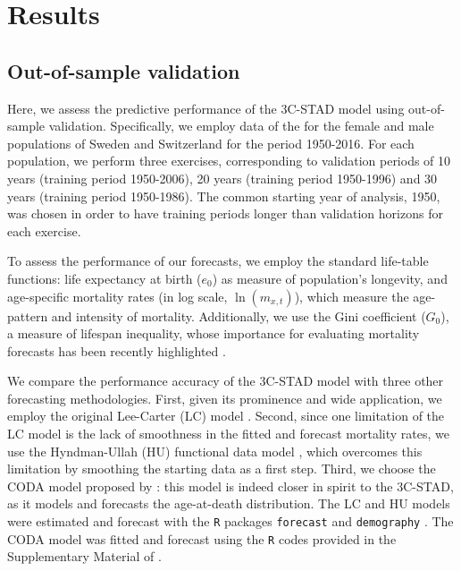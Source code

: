 \documentclass[Thesis]{subfiles}
\begin{document}

\section{Results}\label{Sec:Ch4sec3}


\subsection{Out-of-sample validation}\label{Subsec:Ch4subsec3.1}

Here, we assess the predictive performance of the 3C-STAD model using out-of-sample validation. Specifically, we employ data of the \cite{HMD} for the female and male populations of Sweden and Switzerland for the period 1950-2016. For each population, we perform three exercises, corresponding to validation periods of 10 years (training period 1950-2006), 20 years (training period 1950-1996) and 30 years (training period 1950-1986). The common starting year of analysis, 1950, was chosen in order to have training periods longer than validation horizons for each exercise. 

To assess the performance of our forecasts, we employ the standard life-table functions: life expectancy at birth ($e_{0}$) as measure of population's longevity, and age-specific mortality rates (in log scale, $\ln(m_{x,t})$), which measure the age-pattern and intensity of mortality. Additionally, we use the Gini coefficient ($G_{0}$), a measure of lifespan inequality, whose importance for evaluating mortality forecasts has been recently highlighted \citep{bohk2017lifespan}. 

We compare the performance accuracy of the 3C-STAD model with three other forecasting methodologies. First, given its prominence and wide application, we employ the original Lee-Carter (LC) model \citep{lee1992modeling}. Second, since one limitation of the LC model is the lack of smoothness in the fitted and forecast mortality rates, we use the Hyndman-Ullah (HU) functional data model \citep{hyndman2007robust}, which overcomes this limitation by smoothing the starting data as a first step. Third, we choose the CODA model proposed by \cite{oeppen2008coherent}: this model is indeed closer in spirit to the 3C-STAD, as it models and forecasts the age-at-death distribution. The LC and HU models were estimated and forecast with the \texttt{R} packages \texttt{forecast} and \texttt{demography} \citep{hyndman2018forecastR,demogRpackage,hyndman2008automatic}. The CODA model was fitted and forecast using the \texttt{R} codes provided in the Supplementary Material of \cite{bergeron2017coherent}. 
\end{document}
